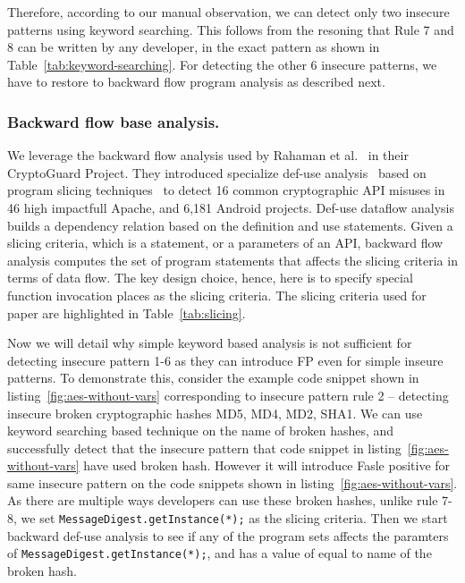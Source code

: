 Therefore, according to our manual observation, we can detect only two insecure patterns using keyword searching. This follows from the resoning 
that Rule 7 and 8 can be written by any developer, in the exact pattern as shown in Table~\ref{tab:keyword-searching}. For detecting the other 6 
insecure patterns, we have to restore to backward flow program analysis as described next.  

\subsubsection{Backward flow base analysis.}
We leverage the backward flow analysis used by Rahaman et al.~\cite{CryptoGuard} in their CryptoGuard Project. 
They introduced specialize def-use analysis~\cite{use-def} based on program slicing techniques~\cite{program-slicing} 
to detect 16 common cryptographic API misuses in 46 high impactfull Apache, and 6,181 Android projects. 
Def-use  dataflow analysis builds a dependency relation based on the definition and use statements. 
Given a slicing criteria, which is a statement, or a parameters of an API, backward flow analysis computes the set of program statements 
that affects the slicing criteria in terms of data flow. 
The key design choice, hence, here is to specify special function invocation places as the slicing criteria. 
The slicing criteria used for paper are highlighted in Table~\ref{tab:slicing}. 

Now we will detail why simple keyword based analysis is not sufficient for detecting insecure pattern 1-6 as they can introduce FP even for simple inseure patterns. 
To demonstrate this, consider the example code snippet shown in listing~\ref{fig:aes-without-vars} corresponding to insecure pattern rule 2 -- 
detecting insecure broken cryptographic hashes MD5, MD4, MD2, SHA1. We can use keyword searching based technique on the name of broken hashes, 
and successfully detect that the insecure pattern that code snippet in listing~\ref{fig:aes-without-vars} have used broken hash. However it will 
introduce Fasle positive for same insecure pattern on the code snippets shown in listing~\ref{fig:aes-without-vars}.%
As there are multiple ways developers can use these broken hashes, unlike rule 7-8, we set \texttt{MessageDigest.getInstance(*);} as the slicing criteria. 
Then we start backward def-use analysis to see if any of the program sets affects the paramters of \texttt{MessageDigest.getInstance(*);}, 
and has a value of equal to name of the broken hash.


